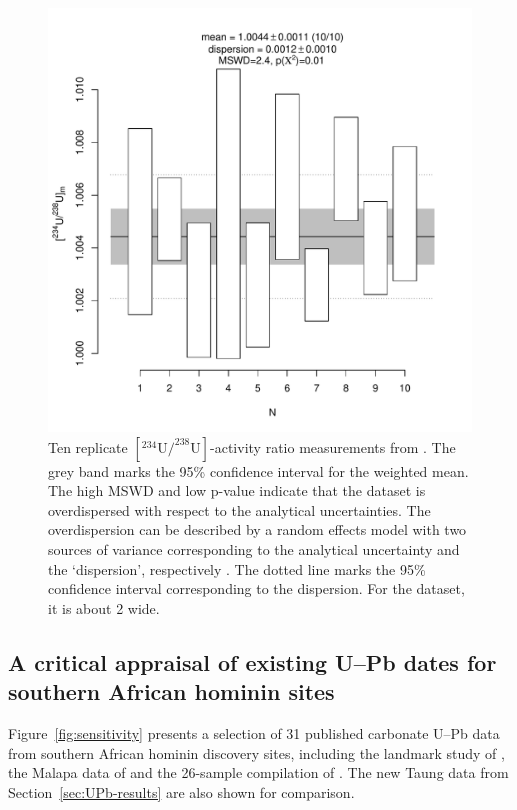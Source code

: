 \documentclass[11pt]{article}
\begin{document}
\begin{figure}[!ht]
  \centering
  \includegraphics[width=.8\textwidth]{Walker48.pdf}
  \caption{Ten replicate $[^{234}\mbox{U/}^{238}\mbox{U}]$-activity
    ratio measurements from  \citet{walker2006}. The grey band marks
    the 95\% confidence interval for the weighted mean. The high MSWD
    and low p-value indicate that the dataset is overdispersed with
    respect to the analytical uncertainties. The overdispersion can be
    described by a random effects model with two sources of variance
    corresponding to the analytical uncertainty and the `dispersion',
    respectively  \citep{vermeesch2012c}. The dotted line marks the
    95\% confidence interval corresponding to the dispersion. For the
     \citet{walker2006} dataset, it is about 2\permil{} wide.}
  \label{fig:Walker48}
\end{figure}

\subsection{A critical appraisal of existing U--Pb dates for southern
African hominin sites}
\label{sec:appraisal}

Figure~\ref{fig:sensitivity} presents a selection of 31 published
carbonate U--Pb data from southern African hominin discovery sites,
including the landmark study of \citet{walker2006}, the Malapa data of
\citet{dirks2010} and the 26-sample compilation of
\citet{pickering2019}. The new Taung data from
Section~\ref{sec:UPb-results} are also shown for comparison.
\end{document}
